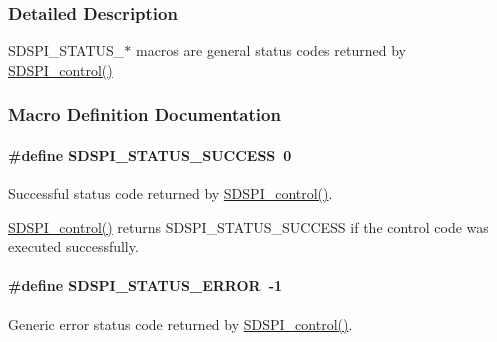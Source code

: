 \subsubsection{Detailed Description}
S\+D\+S\+P\+I\+\_\+\+S\+T\+A\+T\+U\+S\+\_\+$\ast$ macros are general status codes returned by \hyperlink{_s_d_s_p_i_8h_a541a1db109382fe090ed7a9209a34f61}{S\+D\+S\+P\+I\+\_\+control()} 

\subsubsection{Macro Definition Documentation}
\paragraph[{S\+D\+S\+P\+I\+\_\+\+S\+T\+A\+T\+U\+S\+\_\+\+S\+U\+C\+C\+E\+S\+S}]{\setlength{\rightskip}{0pt plus 5cm}\#define S\+D\+S\+P\+I\+\_\+\+S\+T\+A\+T\+U\+S\+\_\+\+S\+U\+C\+C\+E\+S\+S~0}\label{group___s_d_s_p_i___s_t_a_t_u_s_ga5ebecb6ddc00b47b11c1d5ab3ce04108}


Successful status code returned by \hyperlink{_s_d_s_p_i_8h_a541a1db109382fe090ed7a9209a34f61}{S\+D\+S\+P\+I\+\_\+control()}. 

\hyperlink{_s_d_s_p_i_8h_a541a1db109382fe090ed7a9209a34f61}{S\+D\+S\+P\+I\+\_\+control()} returns S\+D\+S\+P\+I\+\_\+\+S\+T\+A\+T\+U\+S\+\_\+\+S\+U\+C\+C\+E\+S\+S if the control code was executed successfully. 
\paragraph[{S\+D\+S\+P\+I\+\_\+\+S\+T\+A\+T\+U\+S\+\_\+\+E\+R\+R\+O\+R}]{\setlength{\rightskip}{0pt plus 5cm}\#define S\+D\+S\+P\+I\+\_\+\+S\+T\+A\+T\+U\+S\+\_\+\+E\+R\+R\+O\+R~-\/1}\label{group___s_d_s_p_i___s_t_a_t_u_s_ga61e58103fc719d0afafddfc7dd11b49d}


Generic error status code returned by \hyperlink{_s_d_s_p_i_8h_a541a1db109382fe090ed7a9209a34f61}{S\+D\+S\+P\+I\+\_\+control()}. 

